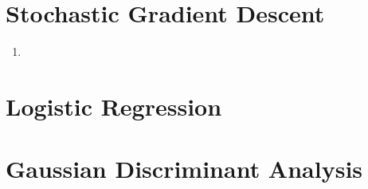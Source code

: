 \documentclass[12pt]{article}
\begin{document}
\clearpage

\section*{Stochastic Gradient Descent}

\begin{enumerate}
    \addtocounter{enumi}{1}
    \item 
\end{enumerate}

\section*{Logistic Regression}

\section*{Gaussian Discriminant Analysis}
\end{document}
